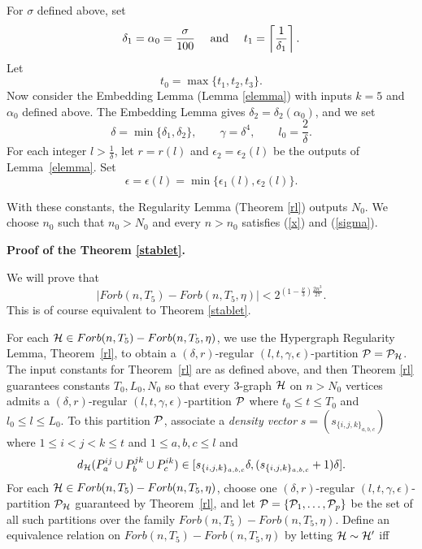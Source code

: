 \documentclass[11pt]{article}
\begin{document}
For $\sigma$ defined above, set
\begin{equation} \label{alpha}\delta_1=\alpha_0=\frac{\sigma}{100} \quad
\hbox{ and } \quad t_1=\left\lceil \frac{1}{\delta_1} \right\rceil.\end{equation}
Let
$$t_0=\max\{t_1, t_2, t_3\}.$$
Now consider the Embedding Lemma (Lemma \ref{elemma}) with inputs $k=5$ and $\alpha_0$
defined above.  The Embedding Lemma gives $\delta_2=\delta_2(\alpha_0)$, and
we set
\begin{equation} \label{delta} \delta=\min\{\delta_1, \delta_2\}, \quad
\quad \gamma=\delta^4, \quad \quad l_0=\frac{2}{\delta}.\end{equation}
For each integer $l>\frac{1}{\delta}$, let $r=r(l)$ and
$\epsilon_2=\epsilon_2(l)$ be the outputs of Lemma~\ref{elemma}. Set
\begin{equation} \label{epsilonl}\epsilon=\epsilon(l)=\min\{\epsilon_1(l), \epsilon_2(l)\}.\end{equation}

With these constants, the Regularity Lemma (Theorem \ref{rl}) outputs $N_0$.  We choose
$n_0$ such that $n_0>N_0$  and every $n>n_0$ satisfies
(\ref{x}) and (\ref{sigma}).

\medskip

{\bf Proof of the Theorem \ref{stablet}.}

We will prove that $$|Forb(n, T_5) - Forb(n, T_5, \eta)|<2^{(1-\frac{
\nu}{3})\frac{2n^3}{27}}.$$  This is of course equivalent to Theorem
\ref{stablet}.

For each $\mathcal{H} \in Forb(n, T_5) - Forb(n, T_5, \eta)$, we use the Hypergraph
Regularity Lemma, Theorem~\ref{rl}, to obtain a $(\delta,
r)$-regular $(l, t, \gamma, \epsilon)$-partition ${\cal P}={\cal P}_{\mathcal{H}}$.
The input constants for Theorem~\ref{rl} are as defined above, and then Theorem \ref{rl} guarantees constants $T_0,
L_0, N_0$ so that every $3$-graph $\mathcal{H}$ on $n>N_0$ vertices admits a
$(\delta, r)$-regular $(l, t, \gamma, \epsilon)$-partition ${\cal P}$
where $t_0 \le t \le T_0$ and $l_0\le l \le L_0$. To this partition ${\cal P}$,
associate a {\em density vector} $s=(s_{\{i,j,k\}_{a,b,c}})$ where $1
\le i<j<k\le t$ and $1\le a,b,c \le l$ and
$$d_{{\cal H}}(P_a^{ij} \cup P_b^{jk} \cup P_c^{ik})\in [s_{\{i,j,k\}_{a,b,c}}\delta, (s_{\{i,j,k\}_{a,b,c}}+1)\delta].$$
For each $\mathcal{H} \in
 Forb(n, T_5) - Forb(n, T_5, \eta)$, choose one $(\delta, r)$-regular $(l, t,
\gamma, \epsilon)$-partition ${\cal P}_{\mathcal{H}}$ guaranteed by Theorem~\ref{rl}, and let ${\cal P}=\{{\cal P}_1, \ldots, {\cal P}_p\}$ be the set of all
such partitions over the family $Forb(n, T_5) -Forb(n, T_5, \eta)$. Define an
equivalence relation on $Forb(n, T_5) -Forb(n, T_5, \eta)$ by letting $\mathcal{H}\sim
\mathcal{H}'$ iff
\end{document}
